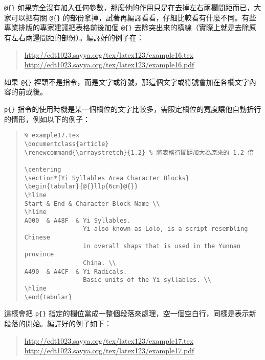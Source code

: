 \verb|@{}| 如果完全沒有加入任何參數，那麼他的作用只是在去掉左右兩欄間距而已，大家可以把有關 \verb|@{}| 的部份拿掉，試著再編譯看看，仔細比較看有什麼不同。有些專業排版的專家建議把表格前後加個 \verb|@{}| 去除突出來的橫線（實際上就是去除原有左右兩邊間距的部份）。編譯好的例子在：

\begin{quote}
  \url{http://edt1023.sayya.org/tex/latex123/example16.tex}\\
  \url{http://edt1023.sayya.org/tex/latex123/example16.pdf}
\end{quote}

如果 \verb|@{}| 裡頭不是指令，而是文字或符號，那這個文字或符號會加在各欄文字內容的前或後。

\verb|p{}| 指令的使用時機是某一個欄位的文字比較多，需限定欄位的寬度讓他自動折行的情形，例如以下的例子：

\begin{quote}
  \begin{verbatim}
% example17.tex
\documentclass{article}
\renewcommand{\arraystretch}{1.2} % 將表格行間距加大為原來的 1.2 倍

\centering
\section*{Yi Syllables Area Character Blocks}
\begin{tabular}{@{}llp{6cm}@{}}
\hline
Start & End & Character Block Name \\
\hline
A000  & A48F  & Yi Syllables.
                Yi also known as Lolo, is a script resembling Chinese 
                in overall shaps that is used in the Yunnan province 
                China. \\
A490  & A4CF  & Yi Radicals.
                Basic units of the Yi syllables. \\
\hline          
\end{tabular}

\end{verbatim}
\end{quote}

這樣會把 \verb|p{}| 指定的欄位當成一整個段落來處理，空一個空白行，同樣是表示新段落的開始。編譯好的例子如下：

\begin{quote}
  \url{http://edt1023.sayya.org/tex/latex123/example17.tex}\\
  \url{http://edt1023.sayya.org/tex/latex123/example17.pdf}
\end{quote}



